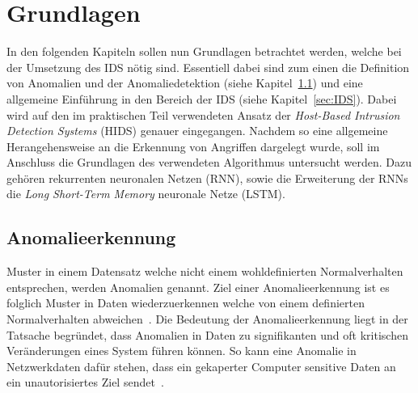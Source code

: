 \chapter{Grundlagen}\label{ch:grundlagen}
    In den folgenden Kapiteln sollen nun Grundlagen betrachtet werden, welche bei der Umsetzung des IDS nötig sind.
    Essentiell dabei sind zum einen die Definition von Anomalien und der Anomaliedetektion (siehe Kapitel~\ref{sec:Anomalieerkennung})
    und eine allgemeine Einführung in den Bereich der IDS (siehe Kapitel~\ref{sec:IDS}).
    Dabei wird auf den im praktischen Teil verwendeten Ansatz der \textit{Host-Based Intrusion Detection Systems} (HIDS) genauer eingegangen.
    Nachdem so eine allgemeine Herangehensweise an die Erkennung von Angriffen dargelegt wurde, 
    soll im Anschluss die Grundlagen des verwendeten Algorithmus untersucht werden.
    Dazu gehören rekurrenten neuronalen Netzen (RNN), sowie die Erweiterung der RNNs die \textit{Long Short-Term Memory} neuronale Netze (LSTM)\@.

    \section{Anomalieerkennung}
    \label{sec:Anomalieerkennung}
        Muster in einem Datensatz welche nicht einem wohldefinierten Normalverhalten entsprechen, werden Anomalien genannt.
        Ziel einer Anomalieerkennung ist es folglich Muster in Daten wiederzuerkennen welche von einem definierten Normalverhalten abweichen~\cite{ANOMALYSURVEY}.
        Die Bedeutung der Anomalieerkennung liegt in der Tatsache begründet, dass Anomalien in Daten zu signifikanten und oft kritischen Veränderungen eines System führen können. 
        So kann eine Anomalie in Netzwerkdaten dafür stehen, dass ein gekaperter Computer sensitive Daten an ein unautorisiertes Ziel sendet~\cite{ANOMALYEXAMPLE}.

